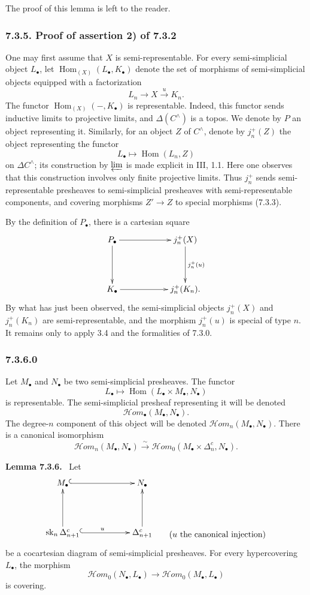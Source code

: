 \documentclass[11pt]{article}
\newcommand{\Hom}{\operatorname{Hom}}
\newcommand{\Hhom}{\mathcal{H}om}
\newcommand{\sk}{\operatorname{sk}}
\newenvironment{statement}[1]{\par\medskip\noindent\textbf{#1.}\ }{\par\medskip}
\begin{document}
The proof of this lemma is left to the reader.

\subsubsection*{7.3.5. Proof of assertion 2) of 7.3.2}
One may first assume that $X$ is semi-representable. For every semi-simplicial object $L_\bullet$, let $\Hom_{(X)}(L_\bullet,K_\bullet)$ denote the set of morphisms of semi-simplicial objects equipped with a factorization
\[
        L_n\to X\xrightarrow{u}K_n.
\]
The functor $\Hom_{(X)}(-,K_\bullet)$ is representable. Indeed, this functor sends inductive limits to projective limits, and $\Delta(C^{\wedge})$ is a topos. We denote by $P$ an object representing it. Similarly, for an object $Z$ of $C^{\wedge}$, denote by $j_n^+(Z)$ the object representing the functor
\[
        L_\bullet\longmapsto \Hom(L_n,Z)
\]
on $\Delta C^{\wedge}$; its construction by $\varprojlim$ is made explicit in III, 1.1. Here one observes that this construction involves only finite projective limits. Thus $j_n^+$ sends semi-representable presheaves to semi-simplicial presheaves with semi-representable components, and covering morphisms $Z'\to Z$ to special morphisms (7.3.3).

By the definition of $P_\bullet$, there is a cartesian square
\[
\xymatrix@C=2cm@R=1.5cm{
P_\bullet\ar[r]\ar[d]&j_n^+(X)\ar[d]^{j_n^+(u)}\\
K_\bullet\ar[r]&j_n^+(K_n).
}
\]
By what has just been observed, the semi-simplicial objects $j_n^+(X)$ and $j_n^+(K_n)$ are semi-representable, and the morphism $j_n^+(u)$ is special of type $n$. It remains only to apply 3.4 and the formalities of 7.3.0.

\subsubsection*{7.3.6.0}
Let $M_\bullet$ and $N_\bullet$ be two semi-simplicial presheaves. The functor
\[
        L_\bullet\longmapsto \Hom(L_\bullet\times M_\bullet,N_\bullet)
\]
is representable. The semi-simplicial presheaf representing it will be denoted
\[
        \Hhom_\bullet(M_\bullet,N_\bullet).
\]
The degree-$n$ component of this object will be denoted $\Hhom_n(M_\bullet,N_\bullet)$. There is a canonical isomorphism
\[
        \Hhom_n(M_\bullet,N_\bullet)\xrightarrow{\sim}\Hhom_0(M_\bullet\times\Delta_n^c,N_\bullet).
\]

\begin{statement}{Lemma 7.3.6}
Let
\[
\xymatrix@C=2cm@R=1.5cm{
M_\bullet\ar@{^{(}->}[r]&N_\bullet\\
\sk_n\Delta_{n+1}^c\ar[u]\ar@{^{(}->}[r]^{u}&\Delta_{n+1}^c\ar[u]&\kern-1.5cm\txt{($u$ the canonical injection)}
}
\]
be a cocartesian diagram of semi-simplicial presheaves. For every hypercovering $L_\bullet$, the morphism
\[
        \Hhom_0(N_\bullet,L_\bullet)\to \Hhom_0(M_\bullet,L_\bullet)
\]
is covering.
\end{statement}
\end{document}
